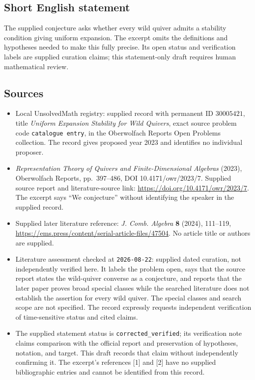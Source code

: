 \documentclass[11pt]{article}
\begin{document}
\subsection{Short English statement}
The supplied conjecture asks whether every wild quiver admits a stability condition giving uniform expansion. The excerpt omits the definitions and hypotheses needed to make this fully precise. Its open status and verification labels are supplied curation claims; this statement-only draft requires human mathematical review.
\subsection{Sources}
\begin{itemize}
\item Local UnsolvedMath registry: supplied record with permanent ID \(30005421\), title \emph{Uniform Expansion Stability for Wild Quivers}, exact source problem code \texttt{catalogue entry}, in the Oberwolfach Reports Open Problems collection. The record gives proposed year 2023 and identifies no individual proposer.
\item \emph{Representation Theory of Quivers and Finite-Dimensional Algebras} (2023), Oberwolfach Reports, pp.\ 397--486, DOI 10.4171/owr/2023/7. Supplied source report and literature-source link: \url{https://doi.org/10.4171/owr/2023/7}. The excerpt says ``We conjecture'' without identifying the speaker in the supplied record.
\item Supplied later literature reference: \emph{J. Comb. Algebra} \textbf{8} (2024), 111--119, \url{https://ems.press/content/serial-article-files/47504}. No article title or authors are supplied.
\item Literature assessment checked at \texttt{2026-08-22}: supplied dated curation, not independently verified here. It labels the problem open, says that the source report states the wild-quiver converse as a conjecture, and reports that the later paper proves broad special classes while the searched literature does not establish the assertion for every wild quiver. The special classes and search scope are not specified. The record expressly requests independent verification of time-sensitive status and cited claims.
\item The supplied statement status is \texttt{corrected\_verified}; its verification note claims comparison with the official report and preservation of hypotheses, notation, and target. This draft records that claim without independently confirming it. The excerpt's references [1] and [2] have no supplied bibliographic entries and cannot be identified from this record.
\end{itemize}
\end{document}
